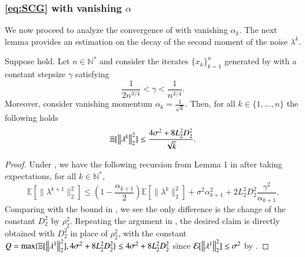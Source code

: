 \begin{toappendix}
\subsubsection{\ref{eq:SCG} with vanishing $\alpha$}\label{subsec:SCGvanishing}
We now proceed to analyze the convergence of  with vanishing $\alpha_k$.
The next lemma provides an estimation on the decay of the second moment of the noise $\lambda^k$.
\begin{lemma}\label{lem:SCG_vanishing_error}
    Suppose  hold. Let $n\in\mathbb{N}^*$ and consider the iterates $\{x_{k}\}_{k=1}^n$ generated by 
    with a constant stepsize $\gamma$ satisfying
    \begin{equation}
        \frac{1}{2 n^{3/4}}<\gamma <\frac{1}{n^{3/4}}.
    \end{equation}
    Moreover, consider vanishing momentum $\alpha_{k}= \frac{1}{\sqrt{k}}$. Then, for all $k\in\{1,\ldots,n\}$ the following holds
    \begin{equation}
            \mathbb{E}[\left\Vert{\lambda^{k}}\right\Vert_{2}^{2}]\leq \frac{4\sigma^2+8L_2^2D_2^2}{\sqrt{k}}.
    \end{equation}
\end{lemma}
\begin{proof}
    Under , we have the following recursion from Lemma 1 in \citet{mokhtari2020stochastic} after taking expectations, for all $k\in\mathbb{N}^*$,
    \begin{equation*}
        \mathbb{E}[\| \lambda^{k+1}\|_2^2] \leq (1-\frac{\alpha_{k+1}}{2})\mathbb{E}[\| \lambda^k\|_2^2] + \sigma^2\alpha_{k+1}^2 + 2L_2^2D_2^2\frac{\gamma^2}{\alpha_{k+1}}.
    \end{equation*}
    Comparing with the bound in , we see the only difference is the change of the constant $D_2^2$ by $\rho_2^2$. Repeating the argument in , the desired claim is directly obtained with $D_2^2$ in place of $\rho_2^2$, with the constant $Q = \max\{\mathbb{E}[\left\Vert{\lambda^1}\right\Vert_2^2], 4\sigma^2+8L_2^2D_2^2\} \leq 4\sigma^2+8L_2^2D_2^2$ since $\mathcal{E}[\left\Vert{\lambda^1}\right\Vert_2^2]\leq \sigma^2$ by .
\end{proof}

\end{toappendix}

